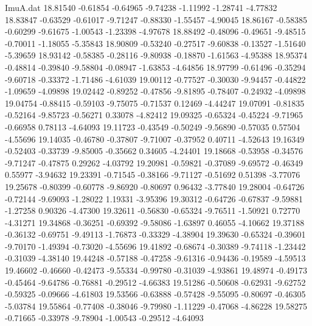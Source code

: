 \begin{filecontents}{ImuA.dat}
  18.81540   -0.61854   -0.64965   -9.74238   -1.11992   -1.28741   -4.77832
  18.83847   -0.63529   -0.61017   -9.71247   -0.88330   -1.55457   -4.90045
  18.86167   -0.58385   -0.60299   -9.61675   -1.00543   -1.23398   -4.97678
  18.88492   -0.48096   -0.49651   -9.48515   -0.70011   -1.18055   -5.35843
  18.90809   -0.53240   -0.27517   -9.60838   -0.13527   -1.51640   -5.39659
  18.93142   -0.58385   -0.28116   -9.80938   -0.18870   -1.61563   -4.95388
  18.95374   -0.48814   -0.39840   -9.58804   -0.08947   -1.63853   -4.64856
  18.97799   -0.61496   -0.35294   -9.60718   -0.33372   -1.71486   -4.61039
  19.00112   -0.77527   -0.30030   -9.94457   -0.44822   -1.09659   -4.09898
  19.02442   -0.89252   -0.47856   -9.81895   -0.78407   -0.24932   -4.09898
  19.04754   -0.88415   -0.59103   -9.75075   -0.71537    0.12469   -4.44247
  19.07091   -0.81835   -0.52164   -9.85723   -0.56271    0.33078   -4.82412
  19.09325   -0.65324   -0.45224   -9.71965   -0.66958    0.78113   -4.64093
  19.11723   -0.43549   -0.50249   -9.56890   -0.57035    0.57504   -4.55696
  19.14035   -0.46780   -0.37807   -9.71007   -0.37952    0.40711   -4.52643
  19.16349   -0.52403   -0.33739   -9.85005   -0.35662    0.34605   -4.24401
  19.18668   -0.53958   -0.34576   -9.71247   -0.47875    0.29262   -4.03792
  19.20981   -0.59821   -0.37089   -9.69572   -0.46349    0.55977   -3.94632
  19.23391   -0.71545   -0.38166   -9.71127   -0.51692    0.51398   -3.77076
  19.25678   -0.80399   -0.60778   -9.86920   -0.80697    0.96432   -3.77840
  19.28004   -0.64726   -0.72144   -9.69093   -1.28022    1.19331   -3.95396
  19.30312   -0.64726   -0.67837   -9.59881   -1.27258    0.90326   -4.47300
  19.32611   -0.56830   -0.65324   -9.76511   -1.50921    0.72770   -4.31271
  19.34868   -0.36251   -0.69392   -9.58086   -1.63897    0.46055   -4.10662
  19.37188   -0.36132   -0.69751   -9.49113   -1.76873   -0.33329   -4.38904
  19.39630   -0.65324   -0.39601   -9.70170   -1.49394   -0.73020   -4.55696
  19.41892   -0.68674   -0.30389   -9.74118   -1.23442   -0.31039   -4.38140
  19.44248   -0.57188   -0.47258   -9.61316   -0.94436   -0.19589   -4.59513
  19.46602   -0.46660   -0.42473   -9.55334   -0.99780   -0.31039   -4.93861
  19.48974   -0.49173   -0.45464   -9.64786   -0.76881   -0.29512   -4.66383
  19.51286   -0.50608   -0.62931   -9.62752   -0.59325   -0.09666   -4.61803
  19.53566   -0.63888   -0.57428   -9.55095   -0.80697   -0.46305   -5.03784
  19.55864   -0.77408   -0.38046   -9.79980   -1.11229   -0.47068   -4.86228
  19.58275   -0.71665   -0.33978   -9.78904   -1.00543   -0.29512   -4.64093

\end{filecontents}
